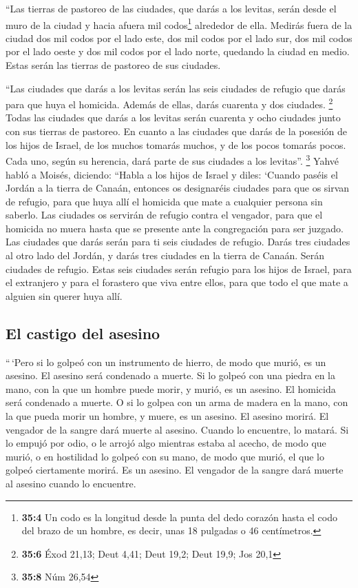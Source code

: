 \begin{paracol}{2}
 ``Las tierras de pastoreo de las ciudades, que darás a
los levitas, serán desde el muro de la ciudad y hacia afuera mil
codos\footnote{\textbf{35:4} Un codo es la longitud desde la punta del
  dedo corazón hasta el codo del brazo de un hombre, es decir, unas 18
  pulgadas o 46 centímetros.} alrededor de ella.  Medirás
fuera de la ciudad dos mil codos por el lado este, dos mil codos por el
lado sur, dos mil codos por el lado oeste y dos mil codos por el lado
norte, quedando la ciudad en medio. Estas serán las tierras de pastoreo
de sus ciudades.

 ``Las ciudades que darás a los levitas serán las seis
ciudades de refugio que darás para que huya el homicida. Además de
ellas, darás cuarenta y dos ciudades. \footnote{\textbf{35:6} Éxod
  21,13; Deut 4,41; Deut 19,2; Deut 19,9; Jos 20,1}  Todas
las ciudades que darás a los levitas serán cuarenta y ocho ciudades
junto con sus tierras de pastoreo.  En cuanto a las
ciudades que darás de la posesión de los hijos de Israel, de los muchos
tomarás muchos, y de los pocos tomarás pocos. Cada uno, según su
herencia, dará parte de sus ciudades a los levitas''. \footnote{\textbf{35:8}
  Núm 26,54}  Yahvé habló a Moisés, diciendo:
 ``Habla a los hijos de Israel y diles: `Cuando paséis el
Jordán a la tierra de Canaán,  entonces os designaréis
ciudades para que os sirvan de refugio, para que huya allí el homicida
que mate a cualquier persona sin saberlo.  Las ciudades
os servirán de refugio contra el vengador, para que el homicida no muera
hasta que se presente ante la congregación para ser juzgado.
 Las ciudades que darás serán para ti seis ciudades de
refugio.  Darás tres ciudades al otro lado del Jordán, y
darás tres ciudades en la tierra de Canaán. Serán ciudades de refugio.
 Estas seis ciudades serán refugio para los hijos de
Israel, para el extranjero y para el forastero que viva entre ellos,
para que todo el que mate a alguien sin querer huya allí.

\hypertarget{el-castigo-del-asesino}{%
\subsection{El castigo del asesino}\label{el-castigo-del-asesino}}

 ``\,`Pero si lo golpeó con un instrumento de hierro, de
modo que murió, es un asesino. El asesino será condenado a muerte.
 Si lo golpeó con una piedra en la mano, con la que un
hombre puede morir, y murió, es un asesino. El homicida será condenado a
muerte.  O si lo golpea con un arma de madera en la mano,
con la que pueda morir un hombre, y muere, es un asesino. El asesino
morirá.  El vengador de la sangre dará muerte al asesino.
Cuando lo encuentre, lo matará.  Si lo empujó por odio, o
le arrojó algo mientras estaba al acecho, de modo que murió,
 o en hostilidad lo golpeó con su mano, de modo que
murió, el que lo golpeó ciertamente morirá. Es un asesino. El vengador
de la sangre dará muerte al asesino cuando lo encuentre.


\end{paracol}
